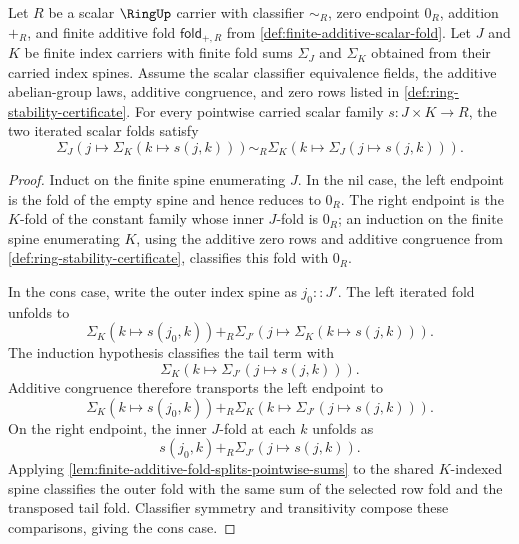 \begin{lemma}
\label{lem:rectangular-scalar-fold-reindexing}
Let $R$ be a scalar $\RingUp$ carrier with classifier $\sim_R$, zero endpoint $0_R$, addition $+_R$, and finite additive fold $\mathsf{fold}_{+,R}$ from \autoref{def:finite-additive-scalar-fold}. Let $J$ and $K$ be finite index carriers with finite fold sums $\Sigma_J$ and $\Sigma_K$ obtained from their carried index spines. Assume the scalar classifier equivalence fields, the additive abelian-group laws, additive congruence, and zero rows listed in \autoref{def:ring-stability-certificate}. For every pointwise carried scalar family $s:J\times K\to R$, the two iterated scalar folds satisfy
$$
\Sigma_J(j\mapsto\Sigma_K(k\mapsto s(j,k)))\sim_R
\Sigma_K(k\mapsto\Sigma_J(j\mapsto s(j,k))).
$$
\end{lemma}
\begin{proof}
Induct on the finite spine enumerating $J$. In the nil case, the left endpoint is the fold of the empty spine and hence reduces to $0_R$. The right endpoint is the $K$-fold of the constant family whose inner $J$-fold is $0_R$; an induction on the finite spine enumerating $K$, using the additive zero rows and additive congruence from \autoref{def:ring-stability-certificate}, classifies this fold with $0_R$.

In the cons case, write the outer index spine as $j_0::J'$. The left iterated fold unfolds to
$$
\Sigma_K(k\mapsto s(j_0,k))+_R
\Sigma_{J'}(j\mapsto\Sigma_K(k\mapsto s(j,k))).
$$
The induction hypothesis classifies the tail term with
$$
\Sigma_K(k\mapsto\Sigma_{J'}(j\mapsto s(j,k))).
$$
Additive congruence therefore transports the left endpoint to
$$
\Sigma_K(k\mapsto s(j_0,k))+_R
\Sigma_K(k\mapsto\Sigma_{J'}(j\mapsto s(j,k))).
$$
On the right endpoint, the inner $J$-fold at each $k$ unfolds as
$$
s(j_0,k)+_R\Sigma_{J'}(j\mapsto s(j,k)).
$$
Applying \autoref{lem:finite-additive-fold-splits-pointwise-sums} to the shared $K$-indexed spine classifies the outer fold with the same sum of the selected row fold and the transposed tail fold. Classifier symmetry and transitivity compose these comparisons, giving the cons case.
\end{proof}


